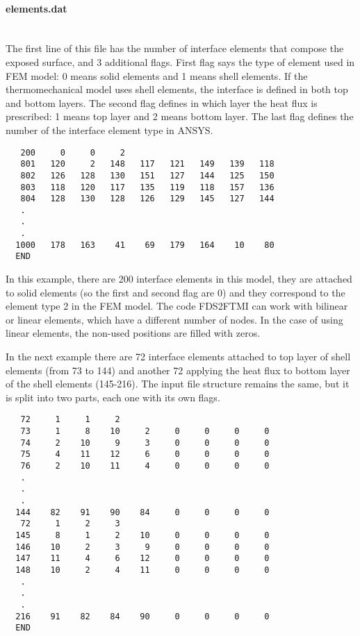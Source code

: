 \documentclass[11pt]{book}
\begin{document}
\paragraph{elements.dat}~\\
The first line of this file has the number of interface elements that compose the exposed surface, and 3 additional flags. First flag says the type of element used in FEM model: 0 means solid elements and 1 means shell elements. If the thermomechanical model uses shell elements, the interface is defined in both top and bottom layers. The second flag defines in which layer the heat flux is prescribed: 1 means top layer and 2 means bottom layer. The last flag defines the number of the interface element type in A{\footnotesize NSYS}.

\begin{verbatim}
   200     0     0     2
   801   120     2   148   117   121   149   139   118
   802   126   128   130   151   127   144   125   150
   803   118   120   117   135   119   118   157   136
   804   128   130   128   126   129   145   127   144
   .
   .
   .
  1000   178   163    41    69   179   164    10    80
  END
\end{verbatim}
In this example, there are 200 interface elements in this model, they are attached to solid elements (so the first and second flag are 0) and they correspond to the element type 2 in the FEM model. The code FDS2FTMI can work with bilinear or linear elements, which have a different number of nodes. In the case of using linear elements, the non-used positions are filled with zeros. 

In the next example there are 72 interface elements attached to top layer of shell elements (from 73 to 144) and another 72 applying the heat flux to bottom layer of the shell elements (145-216). The input file structure remains the same, but it is split into two parts, each one with its own flags.

\begin{verbatim}
   72     1     1     2
   73     1     8    10     2     0     0     0     0
   74     2    10     9     3     0     0     0     0
   75     4    11    12     6     0     0     0     0
   76     2    10    11     4     0     0     0     0
   .
   .
   .
  144    82    91    90    84     0     0     0     0
   72     1     2     3
  145     8     1     2    10     0     0     0     0
  146    10     2     3     9     0     0     0     0
  147    11     4     6    12     0     0     0     0
  148    10     2     4    11     0     0     0     0   
   .
   .
   .
  216    91    82    84    90     0     0     0     0   
  END
\end{verbatim}
\end{document}
